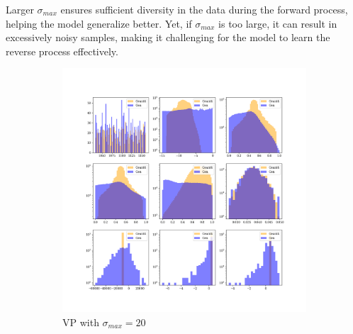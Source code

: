 Larger $\sigma_{max}$ ensures sufficient diversity in the data during the forward process, helping the model generalize better. Yet, if $\sigma_{max}$ is too large, it can result in excessively noisy samples, making it challenging for the model to learn the reverse process effectively.

\begin{figure}[htbp]
    \centering
    \begin{subfigure}[b]{0.4\textwidth} %
        \includegraphics[width=\textwidth]{Figures/vp_20.png}
        \caption{VP with $\sigma_{max} = 20$}
        \label{fig:vp_20}
    \end{subfigure}
    \hspace{0.015\textwidth} %
    \begin{subfigure}[b]{0.4\textwidth}

\end{subfigure}
\end{figure}

